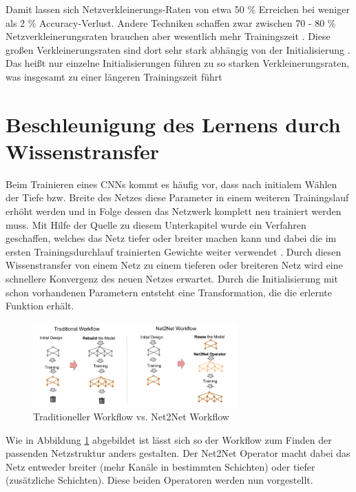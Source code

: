 Damit lassen sich Netzverkleinerungs-Raten von etwa 50 \% Erreichen bei weniger als 2 \% Accuracy-Verlust. Andere Techniken schaffen zwar zwischen 70 - 80 \% Netzverkleinerungsraten brauchen aber wesentlich mehr Trainingszeit \cite{lottery}. Diese großen Verkleinerungsraten sind dort sehr stark abhängig von der Initialisierung \cite{lottery}. Das heißt nur einzelne Initialisierungen führen zu so starken Verkleinerungsraten, was insgesamt zu einer längeren Trainingszeit führt \cite{lottery} 




\section{Beschleunigung des Lernens durch Wissenstransfer}
\color{blue1}
Beim Trainieren eines CNNs kommt es häufig vor, dass nach initialem Wählen der Tiefe bzw. Breite des Netzes diese Parameter in einem weiteren Trainingslauf erhöht werden und in Folge dessen das Netzwerk komplett neu trainiert werden muss. Mit Hilfe der Quelle zu diesem Unterkapitel wurde ein Verfahren geschaffen, welches das Netz tiefer oder breiter machen kann und dabei die im ersten Trainingsdurchlauf trainierten Gewichte weiter verwendet \cite{net2net}. Durch diesen Wissenstransfer von einem Netz zu einem tieferen oder breiteren Netz wird eine schnellere Konvergenz des neuen Netzes erwartet. Durch die Initialisierung mit schon vorhandenen Parametern entsteht eine Transformation, die die erlernte Funktion erhält.

\begin{figure}[h]
 \centering
 \includegraphics[width=0.7\textwidth]{KapitelPartA/images/net2net.png}
 \caption{Traditioneller Workflow vs. Net2Net Workflow}
 \label{abb:net2net}
\end{figure}


Wie in Abbildung \ref{abb:net2net} abgebildet ist lässt sich so der Workflow zum Finden der passenden Netzstruktur anders gestalten. Der Net2Net Operator macht dabei das Netz entweder breiter (mehr Kanäle in bestimmten Schichten) oder tiefer (zusätzliche Schichten). Diese beiden Operatoren werden nun vorgestellt.


